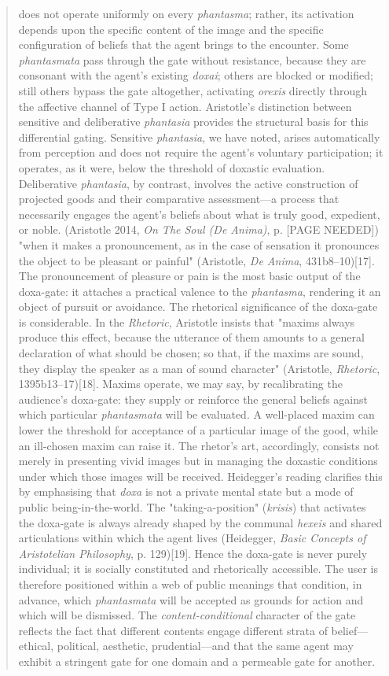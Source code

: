 \documentclass{article}
\begin{document}
\begin{quote}
does not operate uniformly on every \textit{phantasma}; rather, its activation depends upon the specific content of the image and the specific configuration of beliefs that the agent brings to the encounter. Some \textit{phantasmata} pass through the gate without resistance, because they are consonant with the agent's existing \textit{doxai}; others are blocked or modified; still others bypass the gate altogether, activating \textit{orexis} directly through the affective channel of Type I action. Aristotle's distinction between sensitive and deliberative \textit{phantasia} provides the structural basis for this differential gating. Sensitive \textit{phantasia}, we have noted, arises automatically from perception and does not require the agent's voluntary participation; it operates, as it were, below the threshold of doxastic evaluation. Deliberative \textit{phantasia}, by contrast, involves the active construction of projected goods and their comparative assessment---a process that necessarily engages the agent's beliefs about what is truly good, expedient, or noble. (Aristotle 2014, \textit{On The Soul (De Anima)}, p. [PAGE NEEDED]) "when it makes a pronouncement, as in the case of sensation it pronounces the object to be pleasant or painful" (Aristotle, \textit{De Anima}, 431b8--10)[17]. The pronouncement of pleasure or pain is the most basic output of the doxa-gate: it attaches a practical valence to the \textit{phantasma}, rendering it an object of pursuit or avoidance. The rhetorical significance of the doxa-gate is considerable. In the \textit{Rhetoric}, Aristotle insists that "maxims always produce this effect, because the utterance of them amounts to a general declaration of what should be chosen; so that, if the maxims are sound, they display the speaker as a man of sound character" (Aristotle, \textit{Rhetoric}, 1395b13--17)[18]. Maxims operate, we may say, by recalibrating the audience's doxa-gate: they supply or reinforce the general beliefs against which particular \textit{phantasmata} will be evaluated. A well-placed maxim can lower the threshold for acceptance of a particular image of the good, while an ill-chosen maxim can raise it. The rhetor's art, accordingly, consists not merely in presenting vivid images but in managing the doxastic conditions under which those images will be received. Heidegger's reading clarifies this by emphasising that \textit{doxa} is not a private mental state but a mode of public being-in-the-world. The "taking-a-position" (\textit{krisis}) that activates the doxa-gate is always already shaped by the communal \textit{hexeis} and shared articulations within which the agent lives (Heidegger, \textit{Basic Concepts of Aristotelian Philosophy}, p. 129)[19]. Hence the doxa-gate is never purely individual; it is socially constituted and rhetorically accessible. The user is therefore positioned within a web of public meanings that condition, in advance, which \textit{phantasmata} will be accepted as grounds for action and which will be dismissed. The \textit{content-conditional} character of the gate reflects the fact that different contents engage different strata of belief---ethical, political, aesthetic, prudential---and that the same agent may exhibit a stringent gate for one domain and a permeable gate for another. 
\end{quote}
\end{document}
